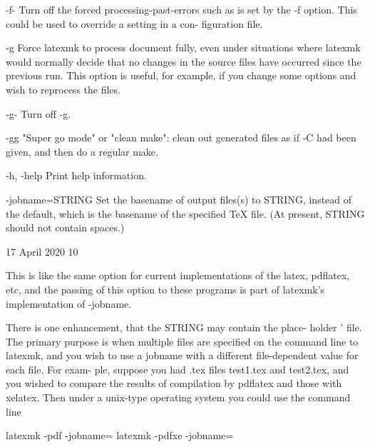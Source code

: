        -f-    Turn off the forced processing-past-errors such as is set by the
              -f  option.   This could be used to override a setting in a con-
              figuration file.


       -g     Force latexmk to process document fully, even  under  situations
              where  latexmk  would  normally  decide  that  no changes in the
              source files have occurred since the previous run.  This  option
              is  useful,  for example, if you change some options and wish to
              reprocess the files.


       -g-    Turn off -g.


       -gg    "Super go mode" or "clean make": clean out generated files as if
              -C had been given, and then do a regular make.


       -h, -help
              Print help information.


       -jobname=STRING
              Set  the  basename  of output files(s) to STRING, instead of the
              default, which is the basename of the specified TeX  file.   (At
              present, STRING should not contain spaces.)




                                 17 April 2020                              10








              This  is like the same option for current implementations of the
              latex, pdflatex, etc, and the passing of this  option  to  these
              programs is part of latexmk's implementation of -jobname.

              There is one enhancement, that the STRING may contain the place-
              holder '%
              file.   The primary purpose is when multiple files are specified
              on the command line to latexmk, and you wish to  use  a  jobname
              with  a different file-dependent value for each file.  For exam-
              ple, suppose you had .tex files test1.tex and test2.tex, and you
              wished  to  compare  the  results of compilation by pdflatex and
              those with xelatex.  Then under a unix-type operating system you
              could use the command line

                  latexmk -pdf -jobname=%
                  latexmk -pdfxe -jobname=%

